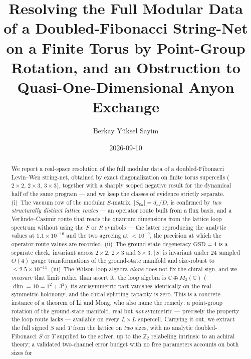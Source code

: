 \documentclass[aps,pra,twocolumn,superscriptaddress,longbibliography,floatfix,nofootinbib]{revtex4-2}
\begin{document}
\setcounter{secnumdepth}{3}

\title{Resolving the Full Modular Data of a Doubled-Fibonacci String-Net
       on a Finite Torus by Point-Group Rotation, and an Obstruction to
       Quasi-One-Dimensional Anyon Exchange}

\author{Berkay Y\"uksel Sayim}

\date{2026-09-10}

\begin{abstract}
We report a real-space resolution of the full modular data of a doubled-Fibonacci Levin--Wen
string-net, obtained by exact diagonalization on finite torus supercells ($2\times2$,
$2\times3$, $3\times3$), together with a sharply scoped negative result for the dynamical half
of the same program --- and we keep the classes of evidence strictly separate. (i)~The vacuum row of the modular
$S$-matrix, $|S_{0a}| = d_a/D$, is confirmed by \emph{two structurally distinct
lattice routes} --- an operator route built from a flux basis, and a
Verlinde--Casimir route that reads the quantum dimensions from the lattice loop
spectrum without using the $F$ or $R$ symbols --- the latter reproducing the
analytic values at $1.1\times10^{-16}$ and the two agreeing at $<10^{-9}$, the
precision at which the operator-route values are recorded. (ii)~The ground-state
degeneracy $\mathrm{GSD}=4$ is a separate check, invariant across $2\times2$,
$2\times3$ and $3\times3$; $|S|$ is invariant under $24$ sampled $O(4)$ gauge
transformations of the ground-state manifold and size-robust to
$\le2.5\times10^{-11}$. (iii)~The Wilson-loop algebra \emph{alone} does not fix
the chiral sign, and we \emph{measure} that limit rather than assert it: the
loop algebra is $\mathbb{C}\oplus M_3(\mathbb{C})$ ($\dim=10=1^{2}+3^{2}$), its
antisymmetric part vanishes identically on the real-symmetric holonomy, and the
chiral splitting capacity is zero. This is a concrete instance of a theorem of
Li and Mong, who also name the remedy: a point-group rotation of the
ground-state manifold, real but \emph{not} symmetric --- precisely the property the loop route
lacks --- available on every $L\times L$ supercell. Carrying it out, we extract
the full signed $S$ and $T$ from the lattice on \emph{two} sizes, with no
analytic doubled-Fibonacci $S$ or $T$ supplied to the solver, up to the
$\mathbb{Z}_2$ relabeling intrinsic to an achiral theory; a validated
two-channel error budget with no free parameters accounts on both sizes for

\end{abstract}
\end{document}
